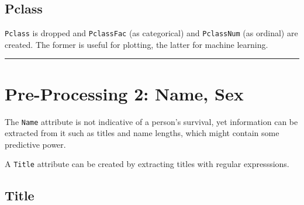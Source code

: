 \documentclass[]{article}
\newenvironment{Shaded}{\begin{snugshade}}{\end{snugshade}}
\newcommand{\KeywordTok}[1]{\textcolor[rgb]{0.13,0.29,0.53}{\textbf{#1}}}
\newcommand{\DecValTok}[1]{\textcolor[rgb]{0.00,0.00,0.81}{#1}}
\newcommand{\StringTok}[1]{\textcolor[rgb]{0.31,0.60,0.02}{#1}}
\newcommand{\CommentTok}[1]{\textcolor[rgb]{0.56,0.35,0.01}{\textit{#1}}}
\newcommand{\OtherTok}[1]{\textcolor[rgb]{0.56,0.35,0.01}{#1}}
\newcommand{\OperatorTok}[1]{\textcolor[rgb]{0.81,0.36,0.00}{\textbf{#1}}}
\newcommand{\NormalTok}[1]{#1}
\begin{document}
\subsection{Pclass}\label{pclass}

\texttt{Pclass} is dropped and \texttt{PclassFac} (as categorical) and
\texttt{PclassNum} (as ordinal) are created. The former is useful for
plotting, the latter for machine learning.

\begin{Shaded}
\end{Shaded}

\begin{center}\rule{0.5\linewidth}{\linethickness}\end{center}

\hypertarget{preprocess2-link}{\section{Pre-Processing 2: Name,
Sex}\label{preprocess2-link}}

The \texttt{Name} attribute is not indicative of a person's survival,
yet information can be extracted from it such as titles and name
lengths, which might contain some predictive power.

A \texttt{Title} attribute can be created by extracting titles with
regular expresssions.

\subsection{Title}\label{title}
\end{document}
